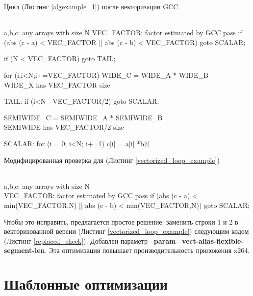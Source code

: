 \begin{ListingEnv}[!h]
	\captiondelim{ } %
	\caption{Цикл (Листинг \ref{algexample_1}) после векторизации GCC}\label{vectorized_loop_example}

	\begin{Verb}

		\\ a,b,c: any arrays with size N
		VEC_FACTOR: factor estimated by GCC pass
		if  (abs (c - a) < VEC_FACTOR  ||  
		     abs (c - b) < VEC_FACTOR) 
		    goto SCALAR;

		if (N < VEC_FACTOR)
		    goto TAIL;
			
		for (i;i<N;i+=VEC_FACTOR)
		    WIDE_C = WIDE_A * WIDE_B 
		    \\ WIDE_X has VEC_FACTOR size 
			
		TAIL:
		if (i<N - VEC_FACTOR/2)
		    goto SCALAR;
			
		SEMIWIDE_C = SEMIWIDE_A * SEMIWIDE_B 
		\\ SEMIWIDE has VEC_FACTOR/2 size 
		
		SCALAR:
		for (i = 0; i<N; i+=1)
		    c[i] = a[i] *b[i]

	\end{Verb}
\end{ListingEnv}

\begin{ListingEnv}[!h]
	\captiondelim{ } %
	\caption{Модифицированная проверка для (Листинг \ref{vectorized_loop_example})}\label{replaced_check}
	
	\begin{Verb}
		
		
		\\ a,b,c: any arrays with size N
		\\ VEC_FACTOR: factor estimated by GCC pass
		if (abs (c - a) < min(VEC_FACTOR,N) ||
		    abs (c - b) < min(VEC_FACTOR,N)) 
		   goto SCALAR;
	\end{Verb}
\end{ListingEnv} 

Чтобы это исправить, предлагается простое решение: заменить строки 1 и 2 в векторизованной версии (Листинг \ref{vectorized_loop_example}) следующим кодом (Листинг \ref{replaced_check}). Добавлен параметр \textbf{--param=vect-alias-flexible-segment-len}. Эта оптимизация повышает производительность приложения x264.




\section{Шаблонные оптимизации}\label{sec:ch2/sect2}
